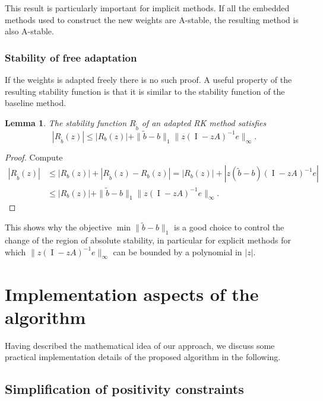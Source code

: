 \documentclass[a4paper]{article}
\numberwithin{equation}{section}
\theoremstyle{plain}
\newtheorem{lemma}[theorem]{Lemma}
\theoremstyle{definition}
\numberwithin{theorem}{section}
\newcommand{\1}{\mathbbm{1}}
\newcommand{\I}{\operatorname{I}}
\newcommand{\bt}{\tilde{b}}
\begin{document}
This result is particularly important for implicit methods.
If all the embedded methods used to construct the new weights
are A-stable, the resulting method is also A-stable.


\subsubsection{Stability of free adaptation}
If the weights is adapted freely there is no such proof.
A useful property of the resulting stability function is that it is similar to the stability function of the baseline method.

\begin{lemma}
  The stability function $R_{\bt}$ of an adapted RK method
  satisfies
  \begin{equation}
    | R_{\bt}(z) |
    \le
    | R_{b}(z) |
    + \| \bt - b \|_1 \| z (\I - z A)^{-1} e \|_\infty.
  \end{equation}
\end{lemma}
\begin{proof}
  Compute
  \begin{equation}
  \begin{aligned}
    | R_{\bt}(z) |
    &\le
    | R_{b}(z) |
    + | R_{\bt}(z) - R_{b}(z) |
    =
    | R_{b}(z) |
    + | z (\bt - b) (\I - z A)^{-1} e|
    \\
    &\le
    | R_{b}(z) |
    + \| \bt - b \|_1 \| z (\I - z A)^{-1} e \|_\infty.
  \end{aligned}
  \end{equation}
\end{proof}
This shows why the objective $\min \| \bt - b \|_1 $ is a good
choice to control the change of the region of absolute stability,
in particular for explicit methods for which
$\| z (\I - z A)^{-1} e \|_\infty$ can be bounded by a polynomial
in $|z|$.


\section{Implementation aspects of the algorithm}\label{sec:imple}

Having described the mathematical idea of our approach,
we discuss some practical implementation details of the
proposed algorithm in the following.


\subsection{Simplification of positivity constraints}
\end{document}

